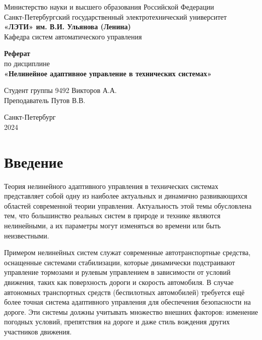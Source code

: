 \documentclass[a4paper,14pt]{extarticle} %
\begin{document}
\begin{titlepage}
    \begin{center}
        \large
        Министерство науки и высшего образования Российской Федерации \\
        Санкт-Петербургский государственный электротехнический университет \\
        \textbf{«ЛЭТИ» им. В.И. Ульянова (Ленина)} \\
        Кафедра систем автоматического управления

        \vfill

        \textbf{Реферат} \\
        по дисциплине \\
        \textbf{«Нелинейное адаптивное управление в технических системах»}

        \vfill

        Студент группы 9492 \hfill Викторов А.А. \\
        Преподаватель \hfill Путов В.В.

        \vfill
        Санкт-Петербург \\
        2024
    \end{center}
\end{titlepage}

\tableofcontents
\newpage

\section{Введение}
Теория нелинейного адаптивного управления в технических системах представляет собой одну из наиболее актуальных и динамично развивающихся областей современной теории управления. Актуальность этой темы обусловлена тем, что большинство реальных систем в природе и технике являются нелинейными, а их параметры могут изменяться во времени или быть неизвестными. 

Примером нелинейных систем служат современные автотранспортные средства, оснащенные системами стабилизации, которые динамически подстраивают управление тормозами и рулевым управлением в зависимости от условий движения, таких как поверхность дороги и скорость автомобиля. В случае автономных транспортных средств (беспилотных автомобилей) требуется ещё более точная система адаптивного управления для обеспечения безопасности на дороге. Эти системы должны учитывать множество внешних факторов: изменение погодных условий, препятствия на дороге и даже стиль вождения других участников движения.
\end{document}
